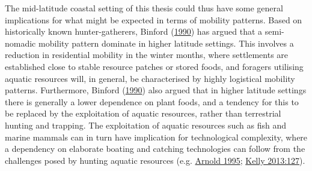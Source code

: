 \documentclass[
  12pt,
  a4paper,
  oneside]{book}
\begin{document}
The mid-latitude coastal setting of this thesis could thus have some general implications for what might be expected in terms of mobility patterns. Based on historically known hunter-gatherers, Binford (\protect\hyperlink{ref-binford1990}{1990}) has argued that a semi-nomadic mobility pattern dominate in higher latitude settings. This involves a reduction in residential mobility in the winter months, where settlements are established close to stable resource patches or stored foods, and foragers utilising aquatic resources will, in general, be characterised by highly logistical mobility patterns. Furthermore, Binford (\protect\hyperlink{ref-binford1990}{1990}) also argued that in higher latitude settings there is generally a lower dependence on plant foods, and a tendency for this to be replaced by the exploitation of aquatic resources, rather than terrestrial hunting and trapping. The exploitation of aquatic resources such as fish and marine mammals can in turn have implication for technological complexity, where a dependency on elaborate boating and catching technologies can follow from the challenges posed by hunting aquatic resources (e.g. \protect\hyperlink{ref-arnold1995}{Arnold 1995}; \protect\hyperlink{ref-kelly2013}{Kelly 2013:127}).
\end{document}
